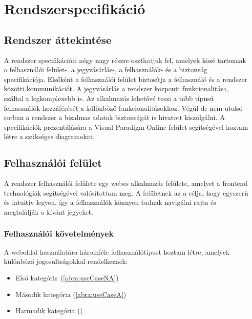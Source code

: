 \chapter{Rendszerspecifikáció} \label{fejezet3}

\section {Rendszer áttekintése}

A rendszer specifikációit négy nagy részre oszthatjuk fel, amelyek közé tartoznak a felhasználói felület-, a jegyvásárlás-, a felhasználók- és a biztonság specifikációja. Elsőként a felhasználói felület biztosítja a felhasználó és a rendszer közötti kommunikációt. A jegyvásárlás a rendszer központi funkcionalitása, ezáltal a legkomplexebb is. Az alkalmazás lehetővé teszi a több típusú felhasználók hozzáférését a különbőző funkcionalitásokhoz. Végül de nem utolsó sorban a rendszer a bizalmas adatok biztonságát is hivatott kiszolgálni. A specifikációk prezentálására a Visual Paradigm Online felület segítségével hoztam létre a szükséges diagramokat.

\section {Felhasználói felület}

A rendszer felhasználói felülete egy webes alkalmazás felülete, amelyet a frontend technológiák segítségével valósítottam meg. A felületnek az a célja, hogy egyszerű és intuitív legyen, így a felhasználók könnyen tudnak navigálni rajta és megtalálják a kívánt jegyeket.

\subsection {Felhasználói követelmények}

A weboldal használatára háromféle felhasználótípust hoztam létre, amelyek különböző jogosultságokkal rendelkeznek:
\begin{itemize}
	\item Első kategória (\ref{abra:useCaseNA})
	\item Második kategória (\ref{abra:useCaseA})
	\item Harmadik kategória ()
\end{itemize}



